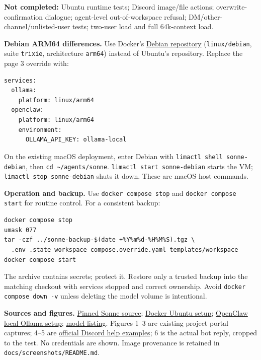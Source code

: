 \documentclass[10pt,a4paper]{article}
\begin{document}
\textbf{Not completed:} Ubuntu runtime tests; Discord image/file actions;
overwrite-confirmation dialogue; agent-level out-of-workspace refusal;
DM/other-channel/unlisted-user tests; two-user load and full 64k-context load.

\textbf{Debian ARM64 differences.} Use Docker's
\href{https://docs.docker.com/engine/install/debian/}{Debian repository}
(\texttt{linux/debian}, suite \texttt{trixie}, architecture \texttt{arm64})
instead of Ubuntu's repository. Replace the page 3 override with:
\begin{lstlisting}
services:
  ollama:
    platform: linux/arm64
  openclaw:
    platform: linux/arm64
    environment:
      OLLAMA_API_KEY: ollama-local
\end{lstlisting}
On the existing macOS deployment, enter Debian with
\texttt{limactl shell sonne-debian}, then \texttt{cd \textasciitilde/agents/sonne}.
\texttt{limactl start sonne-debian} starts the VM; \texttt{limactl stop sonne-debian}
shuts it down. These are macOS host commands.

\textbf{Operation and backup.} Use \texttt{docker compose stop} and
\texttt{docker compose start} for routine control. For a consistent backup:
\begin{lstlisting}
docker compose stop
umask 077
tar -czf ../sonne-backup-$(date +%Y%m%d-%H%M%S).tgz \
  .env .state workspace compose.override.yaml templates/workspace
docker compose start
\end{lstlisting}
The archive contains secrets; protect it. Restore only a trusted backup into the
matching checkout with services stopped and correct ownership. Avoid
\texttt{docker compose down -v} unless deleting the model volume is intentional.

\textbf{Sources and figures.}
\href{https://github.com/Krabbens/sonne/tree/8ffc0b70919edde56538391a94a18214a9aeb868}{Pinned Sonne source};
\href{https://docs.docker.com/engine/install/ubuntu/}{Docker Ubuntu setup};
\href{https://docs.openclaw.ai/providers/ollama/setup}{OpenClaw local Ollama setup};
\href{https://ollama.com/library/qwen3.5:2b-q4_K_M}{model listing}.
Figures 1--3 are existing project portal captures; 4--5 are
\href{https://support.discord.com/hc/en-us/articles/206346498-Where-can-I-find-my-User-Server-Message-ID}{official Discord help examples};
6 is the actual bot reply, cropped to the test. No credentials are shown.
Image provenance is retained in \texttt{docs/screenshots/README.md}.
\end{document}
